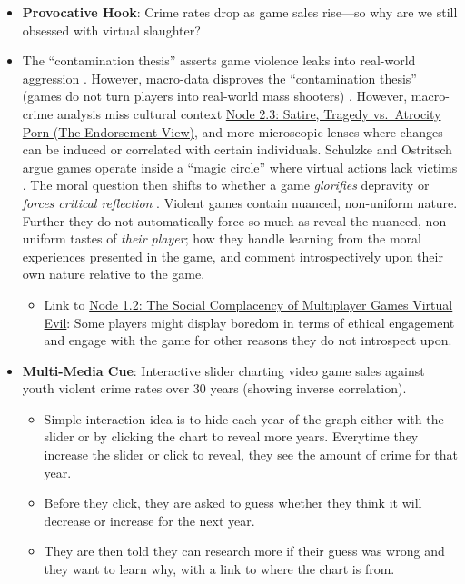 \documentclass[
  a4paper,
  10pt]{article}
\providecommand{\tightlist}{%
  \setlength{\itemsep}{0pt}\setlength{\parskip}{0pt}}
\begin{document}
\begin{itemize}
\item
  \textbf{Provocative Hook}: Crime rates drop as game sales rise---so
  why are we still obsessed with virtual slaughter?
\item
  The ``contamination thesis'' asserts game violence leaks into
  real-world aggression \autocite{goergerValueViolenceEthics2017a}.
  However, macro-data disproves the ``contamination thesis'' (games do
  not turn players into real-world mass shooters)
  \autocite{goergerValueViolenceEthics2017a,schulzkeDefendingMoralityViolent2010a}.
  However, macro-crime analysis miss cultural context
  \hyperref[node-2.3-satire-tragedy-vs.-atrocity-porn-the-endorsement-view]{Node
  2.3: Satire, Tragedy vs.~Atrocity Porn (The Endorsement View)}, and
  more microscopic lenses where changes can be induced or correlated
  with certain individuals. Schulzke and Ostritsch argue games operate
  inside a ``magic circle'' where virtual actions lack victims
  \autocite{ostritschAmoralistChallengeGaming2017a,schulzkeDefendingMoralityViolent2010a}.
  The moral question then shifts to whether a game \emph{glorifies}
  depravity or \emph{forces critical reflection}
  \autocite{goergerValueViolenceEthics2017a,sicartBanalitySimulatedEvil2009a}.
  Violent games contain nuanced, non-uniform nature. Further they do not
  automatically force so much as reveal the nuanced, non-uniform tastes
  of \emph{their player}; how they handle learning from the moral
  experiences presented in the game, and comment introspectively upon
  their own nature relative to the game.

  \begin{itemize}
  \tightlist
  \item
    Link to
    \hyperref[node-1.2-the-social-complacency-of-multiplayer-games-virtual-evil]{Node
    1.2: The Social Complacency of Multiplayer Games Virtual Evil}: Some
    players might display boredom in terms of ethical engagement and
    engage with the game for other reasons they do not introspect upon.
  \end{itemize}
\item
  \textbf{Multi-Media Cue}: Interactive slider charting video game sales
  against youth violent crime rates over 30 years (showing inverse
  correlation)\autocite{schulzkeDefendingMoralityViolent2010a}.

  \begin{itemize}
  \item
    Simple interaction idea is to hide each year of the graph either
    with the slider or by clicking the chart to reveal more years.
    Everytime they increase the slider or click to reveal, they see the
    amount of crime for that year.
  \item
    Before they click, they are asked to guess whether they think it
    will decrease or increase for the next year.
  \item
    They are then told they can research more if their guess was wrong
    and they want to learn why, with a link to where the chart is from.
  \end{itemize}
\end{itemize}
\end{document}
